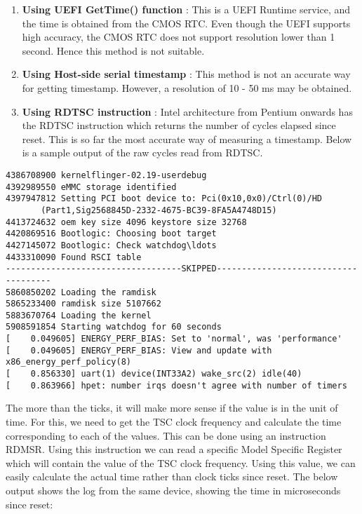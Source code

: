 \begin{enumerate}
	\item \textbf{Using UEFI GetTime() function} :
		This is a UEFI Runtime service, and the time is obtained from the CMOS RTC.
		Even though the UEFI supports high accuracy, the CMOS RTC does not support
		resolution lower than 1 second. Hence this method is not suitable.
	\item \textbf{Using Host-side serial timestamp} :
		This method is not an accurate way for getting timestamp.
		However, a resolution of 10 - 50 ms may be obtained.
	\item \textbf{Using RDTSC instruction} :
		Intel architecture from Pentium onwards has the RDTSC instruction
		which returns the number of cycles elapsed since reset. This is so
		far the most accurate way of measuring a timestamp. Below is a
		sample output of the raw cycles read from RDTSC.	
\end{enumerate}

\begin{Verbatim}[fontsize=\small]
4386708900 kernelflinger-02.19-userdebug
4392989550 eMMC storage identified
4397947812 Setting PCI boot device to: Pci(0x10,0x0)/Ctrl(0)/HD
	   (Part1,Sig2568845D-2332-4675-BC39-8FA5A4748D15)
4413724632 oem key size 4096 keystore size 32768
4420869516 Bootlogic: Choosing boot target
4427145072 Bootlogic: Check watchdog\ldots
4433310090 Found RSCI table
-----------------------------------SKIPPED-------------------------------------
5860850202 Loading the ramdisk
5865233400 ramdisk size 5107662
5883670764 Loading the kernel
5908591854 Starting watchdog for 60 seconds
[    0.049605] ENERGY_PERF_BIAS: Set to 'normal', was 'performance'
[    0.049605] ENERGY_PERF_BIAS: View and update with x86_energy_perf_policy(8)
[    0.856330] uart(1) device(INT33A2) wake_src(2) idle(40)
[    0.863966] hpet: number irqs doesn't agree with number of timers
\end{Verbatim}

The more than the ticks, it will make more sense if the value is in the unit of time.
For this, we need to get the TSC clock frequency and calculate the time corresponding
to each of the values. This can be done using an instruction RDMSR. Using this
instruction we can read a specific Model Specific Register which will contain the value
of the TSC clock frequency. Using this value, we can easily calculate the actual time
rather than clock ticks since reset. The below output shows the log from the same
device, showing the time in microseconds since reset:

